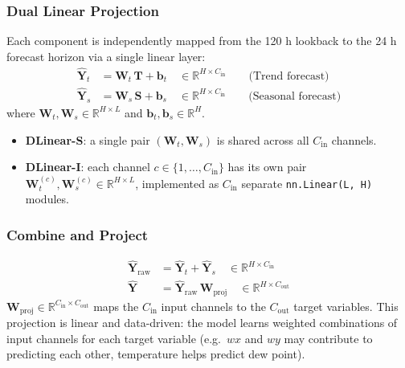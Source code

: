 \documentclass[12pt,a4paper,oneside]{report}
\begin{document}
\subsubsection{Dual Linear Projection}

Each component is independently mapped from the 120 h lookback to the 24 h
forecast horizon via a single linear layer:
%
\begin{align}
\mathbf{\hat{Y}}_t &= \mathbf{W}_t \, \mathbf{T} + \mathbf{b}_t
        \quad \in \mathbb{R}^{H \times C_{\text{in}}}
        \qquad \text{(Trend forecast)} \\
\mathbf{\hat{Y}}_s &= \mathbf{W}_s \, \mathbf{S} + \mathbf{b}_s
        \quad \in \mathbb{R}^{H \times C_{\text{in}}}
        \qquad \text{(Seasonal forecast)}
\end{align}
%
where $\mathbf{W}_t, \mathbf{W}_s \in \mathbb{R}^{H \times L}$ and
$\mathbf{b}_t, \mathbf{b}_s \in \mathbb{R}^{H}$.

\begin{itemize}
  \item \textbf{DLinear-S}: a single pair $(\mathbf{W}_t, \mathbf{W}_s)$ is
        shared across all $C_{\text{in}}$ channels.
  \item \textbf{DLinear-I}: each channel $c \in \{1, \ldots, C_{\text{in}}\}$
        has its own pair $\mathbf{W}_t^{(c)}, \mathbf{W}_s^{(c)} \in
        \mathbb{R}^{H \times L}$, implemented as $C_{\text{in}}$ separate
        \texttt{nn.Linear(L, H)} modules.
\end{itemize}

\subsubsection{Combine and Project}
%
\begin{align}
\mathbf{\hat{Y}}_{\text{raw}} &= \mathbf{\hat{Y}}_t + \mathbf{\hat{Y}}_s
        \quad \in \mathbb{R}^{H \times C_{\text{in}}} \\
\mathbf{\hat{Y}} &= \mathbf{\hat{Y}}_{\text{raw}} \, \mathbf{W}_{\text{proj}}
        \quad \in \mathbb{R}^{H \times C_{\text{out}}}
\end{align}
%
$\mathbf{W}_{\text{proj}} \in \mathbb{R}^{C_{\text{in}} \times C_{\text{out}}}$
maps the $C_{\text{in}}$ input channels to the $C_{\text{out}}$ target variables.
This projection is linear and data-driven: the model learns weighted combinations
of input channels for each target variable (e.g.\ $wx$ and $wy$ may contribute to
predicting each other, temperature helps predict dew point).
\end{document}
